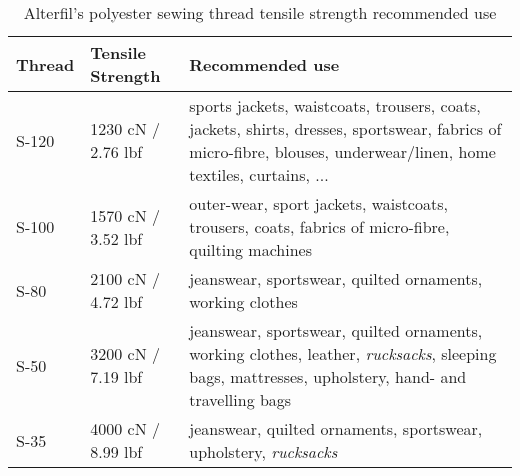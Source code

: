 \begin{table}[H]
  \centering
  \begin{tabular}{ | l | l | p{8cm} | }
    \hline
      \textbf{Thread} &
      \textbf{Tensile Strength} &
      \textbf{Recommended use} \\
    \hline
      S-120 &
      1230 cN / 2.76 lbf &
      sports jackets, waistcoats, trousers, coats, jackets, shirts, dresses, sportswear, fabrics of micro-fibre, blouses, underwear/linen, home textiles, curtains, ... \\
    \hline
      S-100 &
      1570 cN / 3.52 lbf &
      outer-wear, sport jackets, waistcoats, trousers, coats, fabrics of micro-fibre, quilting machines \\
    \hline
      S-80 &
      2100 cN / 4.72 lbf &
      jeanswear, sportswear, quilted ornaments, working clothes \\
    \hline
      S-50 &
      3200 cN / 7.19 lbf &
      jeanswear, sportswear, quilted ornaments, working clothes, leather, \textit{rucksacks}, sleeping bags, mattresses, upholstery, hand- and travelling bags \\
    \hline
      S-35 &
      4000 cN / 8.99 lbf &
      jeanswear, quilted ornaments, sportswear, upholstery, \textit{rucksacks} \\
    \hline
  \end{tabular}
  \caption{Alterfil's polyester sewing thread tensile strength recommended use}
\end{table}
